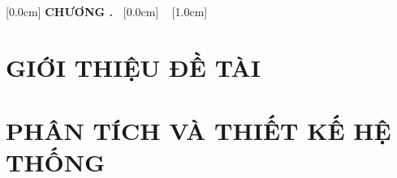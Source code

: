 \documentclass[a4paper,13pt,3p,twoside]{report}
\title{\bf \TITLE}
\author{\AUTHOR}
\theoremstyle{definition}
\begin{document}


\newpage
{}


\newpage
{}


\newpage
{}


\newpage
{}
\renewcommand*\contentsname{MỤC LỤC}
  [0.0cm]
  {\bfseries\vspace{0.3cm}}
  {{\bfseries{\scshape} CHƯƠNG \thecontentslabel.\ }}
  {}
  {\contentspage}
  [0.0cm]
  {\vspace{0.3cm}}
  {\thecontentslabel \ }
  {}
  {\contentspage}
  [1.0cm]
  {\vspace{0.3cm}}
  {\thecontentslabel \ }
  {}
  {\contentspage}

\tableofcontents
\thispagestyle{empty}
\cleardoublepage

\renewcommand{\listfigurename}{DANH MỤC HÌNH VẼ}
{\let\oldnumberline\numberline
\renewcommand{\numberline}{Hình~\oldnumberline}
\listoffigures}
\newpage

\renewcommand{\listtablename}{DANH MỤC BẢNG BIỂU}
{\let\oldnumberline\numberline
\renewcommand{\numberline}{Bảng~\oldnumberline}
\listoftables}
\newpage

\glsaddall
\renewcommand*{\glossaryname}{Danh sách thuật ngữ}
\renewcommand*{\acronymname}{DANH MỤC THUẬT NGỮ VÀ TỪ VIẾT TẮT}
\renewcommand*{\entryname}{Thuật ngữ}
\renewcommand*{\descriptionname}{Ý nghĩa}
\printnoidxglossaries

\newpage
{}
\pagestyle{fancy}
\fancyhf{}
\fancyhead[RE,LO]{\leftmark}
\fancyfoot[RE,LO]{\thepage}

\chapter{GIỚI THIỆU ĐỀ TÀI}
\label{chapter:Introduction}


\newpage
\chapter{PHÂN TÍCH VÀ THIẾT KẾ HỆ THỐNG}
\label{chapter:Analysis}


\newpage
\end{document}
